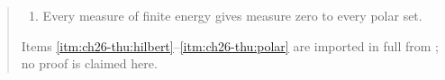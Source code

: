 \begin{quote}
\begin{enumerate}
 zero on \(C^{\An}\),
 \begin{equation}
 \label{eq:ch26-thuillier-dirichlet-principle}
  \sup_{\varphi\in\mathrm A^0(C)}
   \Bigl(2\int_C\varphi\,\rd\nu
         -\langle\varphi,\varphi\rangle_{\mathrm D}\Bigr)
  =E(\nu),
 \end{equation}
 both sides being \(+\infty\) simultaneously; when finite, the supremum is
 attained at the potential \(g\) with \(\ddc g=-\nu\).
\item\label{itm:ch26-thu:polar}
 Every measure of finite energy gives measure zero to every polar set.
\end{enumerate}
Items \cref{itm:ch26-thu:hilbert}--\cref{itm:ch26-thu:polar} are imported in
full from \cite[Propositions~3.5.2, 3.5.7, 3.5.9, 3.5.10 and
Th\'eor\`eme~3.5.11]{Thu05}; no proof is claimed here.
\end{quote}

